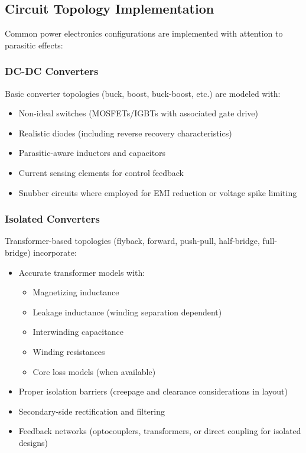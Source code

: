 \subsection{Circuit Topology Implementation}
Common power electronics configurations are implemented with attention to parasitic effects:

\subsubsection{DC-DC Converters}
Basic converter topologies (buck, boost, buck-boost, etc.) are modeled with:
\begin{itemize}
    \item Non-ideal switches (MOSFETs/IGBTs with associated gate drive)
    \item Realistic diodes (including reverse recovery characteristics)
    \item Parasitic-aware inductors and capacitors
    \item Current sensing elements for control feedback
    \item Snubber circuits where employed for EMI reduction or voltage spike limiting
\end{itemize}

\subsubsection{Isolated Converters}
Transformer-based topologies (flyback, forward, push-pull, half-bridge, full-bridge) incorporate:
\begin{itemize}
    \item Accurate transformer models with:
    \begin{itemize}
        \item Magnetizing inductance
        \item Leakage inductance (winding separation dependent)
        \item Interwinding capacitance
        \item Winding resistances
        \item Core loss models (when available)
    \end{itemize}
    \item Proper isolation barriers (creepage and clearance considerations in layout)
    \item Secondary-side rectification and filtering
    \item Feedback networks (optocouplers, transformers, or direct coupling for isolated designs)
\end{itemize}

